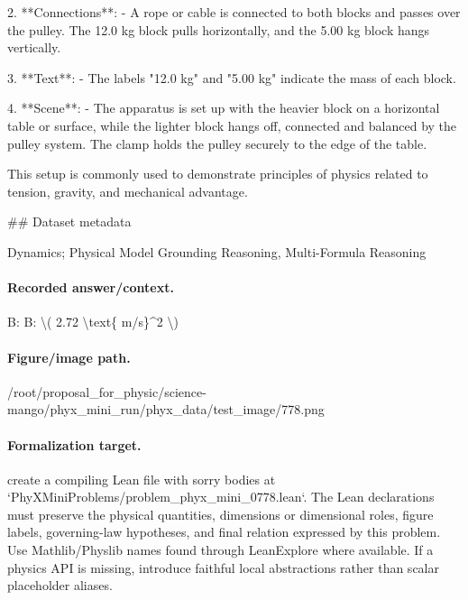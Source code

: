 2. **Connections**:
   - A rope or cable is connected to both blocks and passes over the pulley. The 12.0 kg block pulls horizontally, and the 5.00 kg block hangs vertically.

3. **Text**:
   - The labels "12.0 kg" and "5.00 kg" indicate the mass of each block.

4. **Scene**:
   - The apparatus is set up with the heavier block on a horizontal table or surface, while the lighter block hangs off, connected and balanced by the pulley system. The clamp holds the pulley securely to the edge of the table.

This setup is commonly used to demonstrate principles of physics related to tension, gravity, and mechanical advantage.

\#\# Dataset metadata

Dynamics; Physical Model Grounding Reasoning, Multi-Formula Reasoning

\paragraph{Recorded answer/context.}
B: B: \textbackslash{}( 2.72 \textbackslash{}text\{ m/s\}\textasciicircum{}2 \textbackslash{})

\paragraph{Figure/image path.}
/root/proposal\_for\_physic/science-mango/phyx\_mini\_run/phyx\_data/test\_image/778.png

\paragraph{Formalization target.}
create a compiling Lean file with sorry bodies at `PhyXMiniProblems/problem\_phyx\_mini\_0778.lean`. The Lean declarations must preserve the physical quantities, dimensions or dimensional roles, figure labels, governing-law hypotheses, and final relation expressed by this problem.
Use Mathlib/Physlib names found through LeanExplore where available. If a physics API is missing, introduce faithful local abstractions rather than scalar placeholder aliases.

